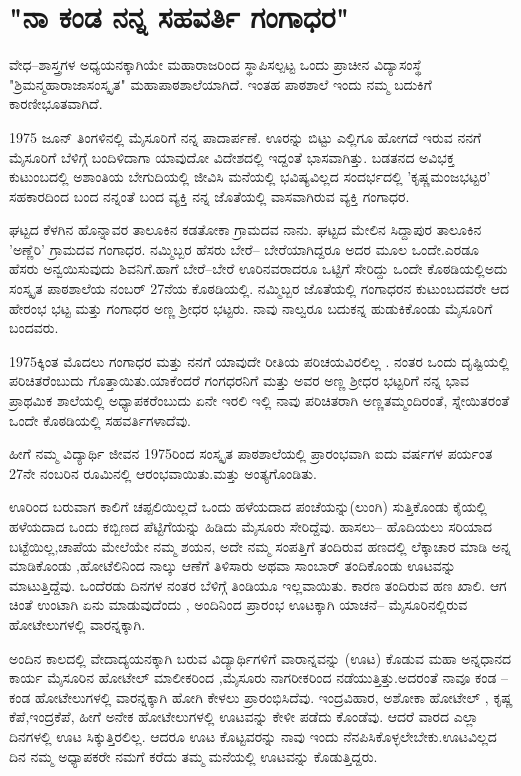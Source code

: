\chapter{"ನಾ ಕಂಡ ನನ್ನ ಸಹವರ್ತಿ ಗಂಗಾಧರ"}

\begin{center}
\addrule
\end{center}

ವೇಧ–ಶಾಸ್ತ್ರಗಳ ಅಧ್ಯಯನಕ್ಕಾಗಿಯೇ ಮಹಾರಾಜರಿಂದ ಸ್ಥಾಪಿಸಲ್ಪಟ್ಟ ಒಂದು ಪ್ರಾಚೀನ ವಿದ್ಯಾಸಂಸ್ಥೆ   "ಶ್ರಿಮನ್ಮಹಾರಾಜಾಸಂಸ್ಕೃತ" ಮಹಾಪಾಠಶಾಲೆಯಾಗಿದೆ.  ಇಂತಹ ಪಾಠಶಾಲೆ ಇಂದು ನಮ್ಮ ಬದುಕಿಗೆ ಕಾರಣೀಭೂತವಾಗಿದೆ. 

1975 ಜೂನ್ ತಿಂಗಳಿನಲ್ಲಿ ಮೈಸೂರಿಗೆ ನನ್ನ ಪಾದಾರ್ಪಣೆ. ಊರನ್ನು ಬಿಟ್ಟು ಎಲ್ಲಿಗೂ ಹೋಗದೆ ಇರುವ ನನಗೆ ಮೈಸೂರಿಗೆ ಬೆಳಿಗ್ಗೆ ಬಂದಿಳಿದಾಗಾ ಯಾವುದೋ ವಿದೇಶದಲ್ಲಿ ಇದ್ದಂತೆ ಭಾಸವಾಗಿತ್ತು. ಬಡತನದ ಅವಿಭಕ್ತ ಕುಟುಂಬದಲ್ಲಿ  ಅಶಾಂತಿಯ ಬೇಗುದಿಯಲ್ಲಿ ಜೀವಿಸಿ ಮನೆಯಲ್ಲಿ ಭವಿಷ್ಯವಿಲ್ಲದ ಸಂದರ್ಭದಲ್ಲಿ 'ಕೃಷ್ಣಮಂಜಭಟ್ಟರ' ಸಹಕಾರದಿಂದ ಬಂದ ನನ್ನಂತೆ  ಬಂದ ವ್ಯಕ್ತಿ ನನ್ನ ಜೊತೆಯಲ್ಲಿ ವಾಸವಾಗಿರುವ ವ್ಯಕ್ತಿ ಗಂಗಾಧರ.

ಘಟ್ಟದ ಕೆಳಗಿನ ಹೊನ್ನಾವರ ತಾಲೂಕಿನ ಕಡತೋಕಾ ಗ್ರಾಮದವ ನಾನು. ಘಟ್ಟದ ಮೇಲಿನ ಸಿದ್ದಾಪುರ ತಾಲೂಕಿನ 'ಅಣ್ಣೆರಿ' ಗ್ರಾಮದವ ಗಂಗಾಧರ. ನಮ್ಮಿಬ್ಬರ ಹೆಸರು ಬೇರೆ– ಬೇರೆಯಾಗಿದ್ದರೂ ಅದರ ಮೂಲ ಒಂದೇ.ಎರಡೂ ಹೆಸರು   ಅನ್ವಯಿಸುವುದು ಶಿವನಿಗೆ.ಹಾಗೆ ಬೇರೆ–ಬೇರೆ  ಊರಿನವರಾದರೂ ಒಟ್ಟಿಗೆ ಸೇರಿದ್ದು ಒಂದೇ ಕೊಠಡಿಯಲ್ಲಿಅದು ಸಂಸ್ಕೃತ ಪಾಠಶಾಲೆಯ  ನಂಬರ್ 27ನೆಯ ಕೊಠಡಿಯಲ್ಲಿ. ನಮ್ಮಿಬ್ಬರ ಜೊತೆಯಲ್ಲಿ ಗಂಗಾಧರನ ಕುಟುಂಬದವರೇ ಆದ ಹೇರಂಭ ಭಟ್ಟ ಮತ್ತು ಗಂಗಾಧರ ಅಣ್ಣ ಶ್ರೀಧರ ಭಟ್ಟರು. ನಾವು ನಾಲ್ವರೂ ಬದುಕನ್ನ ಹುಡುಕಿಕೊಂಡು ಮೈಸೂರಿಗೆ ಬಂದವರು. 

1975ಕ್ಕಿಂತ  ಮೊದಲು ಗಂಗಾಧರ ಮತ್ತು ನನಗೆ ಯಾವುದೇ ರೀತಿಯ ಪರಿಚಯವಿರಲಿಲ್ಲ . ನಂತರ ಒಂದು ದೃಷ್ಟಿಯಲ್ಲಿ ಪರಿಚಿತರೆಂಬುದು ಗೊತ್ತಾಯಿತು.ಯಾಕೆಂದರೆ  ಗಂಗಧರನಿಗೆ ಮತ್ತು ಅವರ ಅಣ್ಣ ಶ್ರೀಧರ ಭಟ್ಟರಿಗೆ  ನನ್ನ ಭಾವ ಪ್ರಾಥಮಿಕ ಶಾಲೆಯಲ್ಲಿ ಅಧ್ಯಾಪಕರೆಂಬುದು  ಏನೇ ಇರಲಿ ಇಲ್ಲಿ ನಾವು ಪರಿಚಿತರಾಗಿ ಅಣ್ಣತಮ್ಮಂದಿರಂತೆ, ಸ್ನೇಯಿತರಂತೆ ಒಂದೇ ಕೊಠಡಿಯಲ್ಲಿ ಸಹವರ್ತಿಗಳಾದೆವು. 

ಹೀಗೆ ನಮ್ಮ ವಿದ್ಯಾರ್ಥಿ ಜೀವನ 1975ರಿಂದ ಸಂಸ್ಕೃತ ಪಾಠಶಾಲೆಯಲ್ಲಿ ಪ್ರಾರಂಭವಾಗಿ ಐದು ವರ್ಷಗಳ ಪರ್ಯಂತ 27ನೇ ನಂಬರಿನ ರೂಮಿನಲ್ಲಿ ಆರಂಭವಾಯಿತು.ಮತ್ತು ಅಂತ್ಯಗೊಂಡಿತು. 

ಊರಿಂದ ಬರುವಾಗ ಕಾಲಿಗೆ ಚಪ್ಪಲಿಯಿಲ್ಲದೆ ಒಂದು ಹಳೆಯದಾದ ಪಂಚೆಯನ್ನು(ಲುಂಗಿ) ಸುತ್ತಿಕೊಂಡು ಕೈಯಲ್ಲಿ ಹಳೆಯದಾದ ಒಂದು ಕಬ್ಬಿಣದ ಪೆಟ್ಟಿಗೆಯನ್ನು ಹಿಡಿದು ಮೈಸೂರು ಸೇರಿದ್ದೆವು. ಹಾಸಲು– ಹೊದಿಯಲು ಸರಿಯಾದ ಬಟ್ಟೆಯಿಲ್ಲ,ಚಾಪೆಯ ಮೇಲೆಯೇ ನಮ್ಮ ಶಯನ, ಅದೇ ನಮ್ಮ ಸಂಪತ್ತಿಗೆ ತಂದಿರುವ ಹಣದಲ್ಲಿ ಲೆಕ್ಕಾಚಾರ ಮಾಡಿ ಅನ್ನ ಮಾಡಿಕೊಂಡು ,ಹೋಟೆಲಿನಿಂದ ನಾಲ್ಕು ಆಣೆಗೆ ತಿಳಿಸಾರು  ಅಥವಾ ಸಾಂಬಾರ್ ತಂದಿಕೊಂಡು ಊಟವನ್ನು ಮಾಟುತ್ತಿದ್ದೆವು. ಒಂದೆರಡು ದಿನಗಳ ನಂತರ ಬೆಳಿಗ್ಗೆ ತಿಂಡಿಯೂ ಇಲ್ಲವಾಯಿತು. ಕಾರಣ ತಂದಿರುವ ಹಣ ಖಾಲಿ. ಆಗ ಚಿಂತೆ ಉಂಟಾಗಿ ಏನು ಮಾಡುವುದೆಂದು , ಅಂದಿನಿಂದ ಪ್ರಾರಂಭ ಊಟಕ್ಕಾಗಿ ಯಾಚನೆ– ಮೈಸೂರಿನಲ್ಲಿರುವ ಹೋಟೇಲುಗಳಲ್ಲಿ ವಾರನ್ನಕ್ಕಾಗಿ.

ಅಂದಿನ ಕಾಲದಲ್ಲಿ ವೇದಾದ್ಯಯನಕ್ಕಾಗಿ ಬರುವ ವಿದ್ಯಾರ್ಥಿಗಳಿಗೆ ವಾರಾನ್ನವನ್ನು (ಊಟ) ಕೊಡುವ ಮಹಾ ಅನ್ನಧಾನದ ಕಾರ್ಯ ಮೈಸೂರಿನ ಹೋಟೇಲ್ ಮಾಲೀಕರಿಂದ ,ಮೈಸೂರು ನಾಗರೀಕರಿಂದ ನಡೆಯುತ್ತಿತ್ತು.ಅದರಂತೆ ನಾವೂ ಕಂಡ –ಕಂಡ  ಹೋಟೇಲುಗಳಲ್ಲಿ ವಾರನ್ನಕ್ಕಾಗಿ ಹೋಗಿ ಕೇಳಲು ಪ್ರಾರಂಭಿಸಿದೆವು. ಇಂದ್ರವಿಹಾರ, ಅಶೋಕಾ ಹೋಟೇಲ್ , ಕೃಷ್ಣ ಕೆಪೆ,ಇಂದ್ರಕೆಪೆ, ಹೀಗೆ ಅನೇಕ ಹೋಟೇಲುಗಳಲ್ಲಿ ಊಟವನ್ನು ಕೇಳೀ ಪಡೆದು ಕೊಂಡೆವು. ಆದರೆ ವಾರದ ಎಲ್ಲಾ ದಿನಗಳಲ್ಲಿ ಊಟ ಸಿಕ್ಕುತ್ತಿರಲಿಲ್ಲ. ಆದರೂ ಊಟ ಕೊಟ್ಟವರನ್ನು ನಾವು ಇಂದು ನೆನಪಿಸಿಕೊಳ್ಳಲೇಬೇಕು.ಊಟವಿಲ್ಲದ ದಿನ ನಮ್ಮ ಅಧ್ಯಾಪಕರೇ ನಮಗೆ ಕರೆದು ತಮ್ಮ ಮನೆಯಲ್ಲಿ ಊಟವನ್ನು ಕೊಡುತ್ತಿದ್ದರು. 

